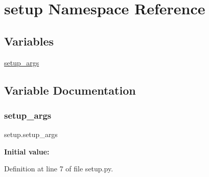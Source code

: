 \hypertarget{namespacesetup}{}\section{setup Namespace Reference}
\label{namespacesetup}
\subsection*{Variables}
\begin{DoxyCompactItemize}
\item 
\mbox{\hyperlink{namespacesetup_a504ffa482edfe0eff08f64b2f5dff0e9}{setup\+\_\+args}}
\end{DoxyCompactItemize}


\subsection{Variable Documentation}
\mbox{\label{namespacesetup_a504ffa482edfe0eff08f64b2f5dff0e9}} 
\subsubsection{\texorpdfstring{setup\_args}{setup\_args}}
{\footnotesize\ttfamily setup.\+setup\+\_\+args}

{\bfseries Initial value\+:}
\begin{DoxyCode}{0}

\end{DoxyCode}


Definition at line 7 of file setup.\+py.


